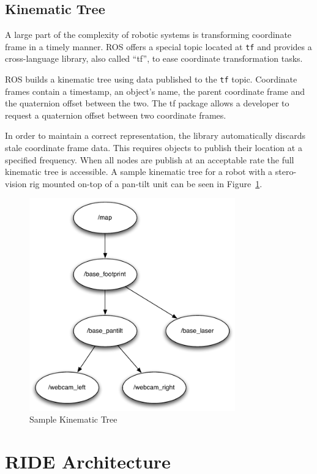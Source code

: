 \subsection{Kinematic Tree}
A large part of the complexity of robotic systems is transforming coordinate frame in a timely manner. ROS offers a special topic located at \verb!tf! and provides a cross-language library, also called ``tf'', to ease coordinate transformation tasks.

ROS builds a kinematic tree using data published to the \verb!tf! topic. Coordinate frames contain a timestamp, an object's name, the parent coordinate frame and the quaternion offset between the two. The tf package allows a developer to request a quaternion offset between two coordinate frames. 

In order to maintain a correct representation, the library automatically discards stale coordinate frame data. This requires objects to publish their location at a specified frequency. When all nodes are publish at an acceptable rate the full kinematic tree is accessible. A sample kinematic tree for a robot with a stero-vision rig mounted on-top of a pan-tilt unit can be seen in Figure~\ref{fig:tf-example}.

\begin{figure}[ht]
\begin{center}
\includegraphics[width=3.5in]{images/tf-example.pdf}
\caption{Sample Kinematic Tree\label{fig:tf-example}}
\end{center}
\end{figure}

\section{RIDE Architecture}


